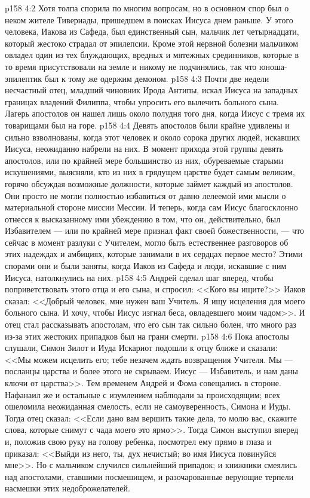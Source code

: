 \vs p158 4:2 Хотя толпа спорила по многим вопросам, но в основном спор был о неком жителе Тивериады, пришедшем в поисках Иисуса днем раньше. У этого человека, Иакова из Сафеда, был единственный сын, мальчик лет четырнадцати, который жестоко страдал от эпилепсии. Кроме этой нервной болезни мальчиком овладел один из тех блуждающих, вредных и мятежных срединников, которые в то время присутствовали на земле и никому не подчинялись, так что юноша\hyp{}эпилептик был к тому же одержим демоном.
\vs p158 4:3 Почти две недели несчастный отец, младший чиновник Ирода Антипы, искал Иисуса на западных границах владений Филиппа, чтобы упросить его вылечить больного сына. Лагерь апостолов он нашел лишь около полудня того дня, когда Иисус с тремя их товарищами был на горе.
\vs p158 4:4 Девять апостолов были крайне удивлены и сильно взволнованы, когда этот человек и около сорока других людей, искавших Иисуса, неожиданно набрели на них. В момент прихода этой группы девять апостолов, или по крайней мере большинство из них, обуреваемые старыми искушениями, выясняли, кто из них в грядущем царстве будет самым великим, горячо обсуждая возможные должности, которые займет каждый из апостолов. Они просто не могли полностью избавиться от давно лелеемой ими мысли о материальной стороне миссии Мессии. И теперь, когда сам Иисус благосклонно отнесся к высказанному ими убеждению в том, что он, действительно, был Избавителем --- или по крайней мере признал факт своей божественности, --- что сейчас в момент разлуки с Учителем, могло быть естественнее разговоров об этих надеждах и амбициях, которые занимали в их сердцах первое место? Этими спорами они и были заняты, когда Иаков из Сафеда и люди, искавшие с ним Иисуса, натолкнулись на них.
\vs p158 4:5 Андрей сделал шаг вперед, чтобы поприветствовать этого отца и его сына, и спросил: <<Кого вы ищите?>> Иаков сказал: <<Добрый человек, мне нужен ваш Учитель. Я ищу исцеления для моего больного сына. И хочу, чтобы Иисус изгнал беса, овладевшего моим чадом>>. И отец стал рассказывать апостолам, что его сын так сильно болен, что много раз из\hyp{}за этих жестоких припадков был на грани смерти.
\vs p158 4:6 Пока апостолы слушали, Симон Зилот и Иуда Искариот подошли к отцу ближе и сказали: <<Мы можем исцелить его; тебе незачем ждать возвращения Учителя. Мы --- посланцы царства и более этого не скрываем. Иисус --- Избавитель, и нам даны ключи от царства>>. Тем временем Андрей и Фома совещались в стороне. Нафанаил же и остальные с изумлением наблюдали за происходящим; всех ошеломила неожиданная смелость, если не самоуверенность, Симона и Иуды. Тогда отец сказал: <<Если дано вам вершить такие дела, то молю вас, скажите слова, которые снимут с чада моего это ярмо>>. Тогда Симон выступил вперед и, положив свою руку на голову ребенка, посмотрел ему прямо в глаза и приказал: <<Выйди из него, ты, дух нечистый; во имя Иисуса повинуйся мне>>. Но с мальчиком случился сильнейший припадок; и книжники смеялись над апостолами, ставшими посмешищем, и разочарованные верующие терпели насмешки этих недоброжелателей.
